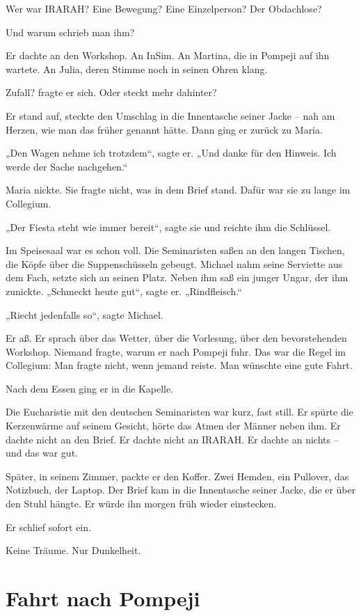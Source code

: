 \documentclass[
]{article}
\begin{document}
Wer war IRARAH? Eine Bewegung? Eine Einzelperson? Der Obdachlose?

Und warum schrieb man ihm?

Er dachte an den Workshop. An InSim. An Martina, die in Pompeji auf ihn wartete. An Julia, deren Stimme noch in seinen Ohren klang.

Zufall? fragte er sich. Oder steckt mehr dahinter?

Er stand auf, steckte den Umschlag in die Innentasche seiner Jacke -- nah am Herzen, wie man das früher genannt hätte. Dann ging er zurück zu Maria.

„Den Wagen nehme ich trotzdem``, sagte er. „Und danke für den Hinweis. Ich werde der Sache nachgehen.``

Maria nickte. Sie fragte nicht, was in dem Brief stand. Dafür war sie zu lange im Collegium.

„Der Fiesta steht wie immer bereit``, sagte sie und reichte ihm die Schlüssel.

Im Speisesaal war es schon voll. Die Seminaristen saßen an den langen Tischen, die Köpfe über die Suppenschüsseln gebeugt. Michael nahm seine Serviette aus dem Fach, setzte sich an seinen Platz. Neben ihm saß ein junger Ungar, der ihm zunickte. „Schmeckt heute gut``, sagte er. „Rindfleisch.``

„Riecht jedenfalls so``, sagte Michael.

Er aß. Er sprach über das Wetter, über die Vorlesung, über den bevorstehenden Workshop. Niemand fragte, warum er nach Pompeji fuhr. Das war die Regel im Collegium: Man fragte nicht, wenn jemand reiste. Man wünschte eine gute Fahrt.

Nach dem Essen ging er in die Kapelle.

Die Eucharistie mit den deutschen Seminaristen war kurz, fast still. Er spürte die Kerzenwärme auf seinem Gesicht, hörte das Atmen der Männer neben ihm. Er dachte nicht an den Brief. Er dachte nicht an IRARAH. Er dachte an nichts -- und das war gut.

Später, in seinem Zimmer, packte er den Koffer. Zwei Hemden, ein Pullover, das Notizbuch, der Laptop. Der Brief kam in die Innentasche seiner Jacke, die er über den Stuhl hängte. Er würde ihn morgen früh wieder einstecken.

Er schlief sofort ein.

Keine Träume. Nur Dunkelheit.

\section{Fahrt nach Pompeji}\label{fahrt-nach-pompeji}
\end{document}
